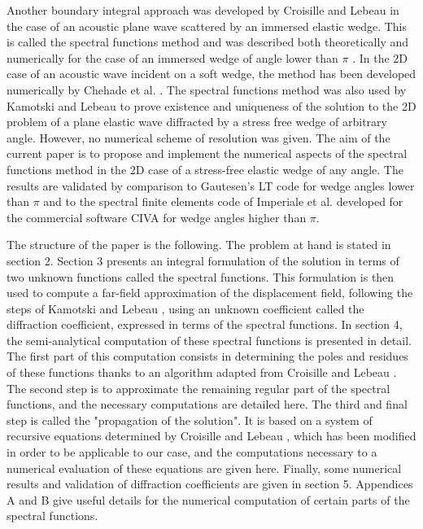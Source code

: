 Another boundary integral approach was developed by Croisille and Lebeau \cite{CroisilleLebeau} in the case of an acoustic plane wave scattered by an immersed elastic wedge. This is called the spectral functions method and was described both theoretically and numerically for the case of an immersed wedge of angle lower than $\pi$ \cite{CroisilleLebeau}.  In the 2D case of an acoustic wave incident on a soft wedge, the method has been developed numerically by Chehade et al. \cite{article}. The spectral functions method was also used by Kamotski and Lebeau \cite{KamotskiLebeau} to prove existence and uniqueness of the solution to the 2D problem of a plane elastic wave diffracted by a stress free wedge of arbitrary angle. However, no numerical scheme of resolution was given. The aim of the current paper is to propose and implement the numerical aspects of the spectral functions method in the 2D case of a stress-free elastic wedge of any angle. The results are validated by comparison to Gautesen's LT code \cite{GautesenFradkin} for wedge angles lower than $\pi$ and to the spectral finite elements code of Imperiale et al. developed for the commercial software CIVA \cite{imperiale_ut_2016, imperiale_ut_2017} for wedge angles higher than $\pi$.

The structure of the paper is the following. The problem at hand is stated in section 2. Section 3 presents an integral formulation of the solution in terms of two unknown functions called the spectral functions. This formulation is then used to compute a far-field approximation of the displacement field, following the steps of Kamotski and Lebeau \cite{KamotskiLebeau}, using an unknown coefficient called the diffraction coefficient, expressed in terms of the spectral functions. In section 4, the semi-analytical computation of these spectral functions is presented in detail. The first part of this computation consists in determining the poles and residues of these functions thanks to an algorithm adapted from Croisille and Lebeau \cite{CroisilleLebeau}. The second step is to approximate the remaining regular part of the spectral functions, and the necessary computations are detailed here. The third and final step is called the "propagation of the solution". It is based on a system of recursive equations determined by Croisille and Lebeau \cite{CroisilleLebeau}, which has been modified in order to be applicable to our case, and the computations necessary to a numerical evaluation of these equations are given here. Finally, some numerical results and validation of diffraction coefficients are given in section 5. Appendices A and B give useful details for the numerical computation of certain parts of the spectral functions.
